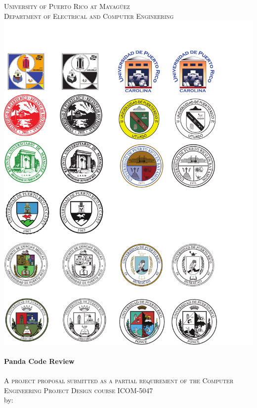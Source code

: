 \begin{titlepage}

\begin{center}


    

\textsc{\large University of Puerto Rico at Mayagüez}\\[0.3cm]
\textsc{\large Department of Electrical and Computer Engineering}\\[1cm]
\includegraphics[scale=1.25]{res/logo_rum}\\[1cm]


\HRule \\[0.4cm]
{ \huge \bfseries Panda Code Review}\\
\HRule \\[0.3cm]
\textsc{A project proposal submitted as a partial requirement of the Computer Engineering Project Design course ICOM-5047}\\[0.7cm]

by: \\[0.3cm]


\end{center}
\end{titlepage}
